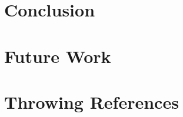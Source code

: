 \documentclass[conference]{IEEEtran}
\begin{document}
\section{Conclusion}

\section{Future Work}

\section{Throwing References}

\cite{atanassov1986intuitionistic}
\cite{atanassov2003intuitionistic}
\cite{davarzani2013novel}
\cite{despi2013generalised}
\cite{sharma2011cut}
\cite{sharma2011cutgroups}
\cite{akram2014intuitionistic}
\cite{cornelis2001compositional}
\cite{castillo2007intuitionistic}
\cite{bustince1995method}
\cite{marinov2005method}
\cite{atanassov2013intuitionistic}
\cite{zadeh1965fuzzy}
\cite{klir1995fuzzy}
\cite{pedrycz1998shadowed}
\cite{mendel2001uncertain}
\cite{mendel2002type}
\cite{liang2000interval}
\cite{mendel2006interval}
\cite{karnik2001centroid}
\cite{castro2007interval}
\cite{wagner2013juzzy}



\end{document}
